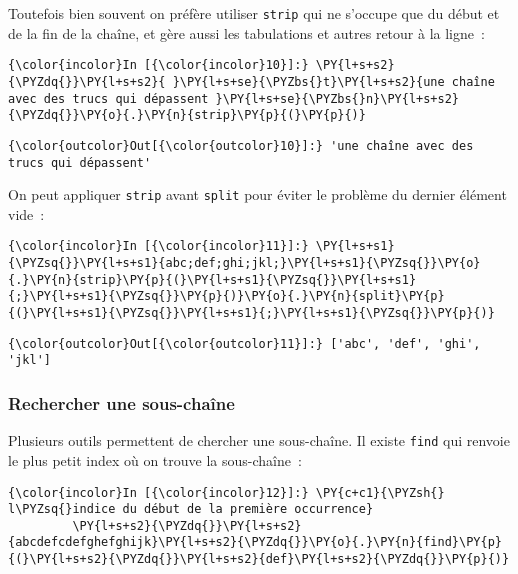     Toutefois bien souvent on préfère utiliser \texttt{strip} qui ne
s'occupe que du début et de la fin de la chaîne, et gère aussi les
tabulations et autres retour à la ligne~:

    \begin{Verbatim}[commandchars=\\\{\}]
{\color{incolor}In [{\color{incolor}10}]:} \PY{l+s+s2}{\PYZdq{}}\PY{l+s+s2}{ }\PY{l+s+se}{\PYZbs{}t}\PY{l+s+s2}{une chaîne avec des trucs qui dépassent }\PY{l+s+se}{\PYZbs{}n}\PY{l+s+s2}{\PYZdq{}}\PY{o}{.}\PY{n}{strip}\PY{p}{(}\PY{p}{)}
\end{Verbatim}


\begin{Verbatim}[commandchars=\\\{\}]
{\color{outcolor}Out[{\color{outcolor}10}]:} 'une chaîne avec des trucs qui dépassent'
\end{Verbatim}
            
    On peut appliquer \texttt{strip} avant \texttt{split} pour éviter le
problème du dernier élément vide~:

    \begin{Verbatim}[commandchars=\\\{\}]
{\color{incolor}In [{\color{incolor}11}]:} \PY{l+s+s1}{\PYZsq{}}\PY{l+s+s1}{abc;def;ghi;jkl;}\PY{l+s+s1}{\PYZsq{}}\PY{o}{.}\PY{n}{strip}\PY{p}{(}\PY{l+s+s1}{\PYZsq{}}\PY{l+s+s1}{;}\PY{l+s+s1}{\PYZsq{}}\PY{p}{)}\PY{o}{.}\PY{n}{split}\PY{p}{(}\PY{l+s+s1}{\PYZsq{}}\PY{l+s+s1}{;}\PY{l+s+s1}{\PYZsq{}}\PY{p}{)}
\end{Verbatim}


\begin{Verbatim}[commandchars=\\\{\}]
{\color{outcolor}Out[{\color{outcolor}11}]:} ['abc', 'def', 'ghi', 'jkl']
\end{Verbatim}
            
    \hypertarget{rechercher-une-sous-chauxeene}{%
\subsubsection{Rechercher une
sous-chaîne}\label{rechercher-une-sous-chauxeene}}

    Plusieurs outils permettent de chercher une sous-chaîne. Il existe
\texttt{find} qui renvoie le plus petit index où on trouve la
sous-chaîne~:

    \begin{Verbatim}[commandchars=\\\{\}]
{\color{incolor}In [{\color{incolor}12}]:} \PY{c+c1}{\PYZsh{} l\PYZsq{}indice du début de la première occurrence}
         \PY{l+s+s2}{\PYZdq{}}\PY{l+s+s2}{abcdefcdefghefghijk}\PY{l+s+s2}{\PYZdq{}}\PY{o}{.}\PY{n}{find}\PY{p}{(}\PY{l+s+s2}{\PYZdq{}}\PY{l+s+s2}{def}\PY{l+s+s2}{\PYZdq{}}\PY{p}{)}
\end{Verbatim}


